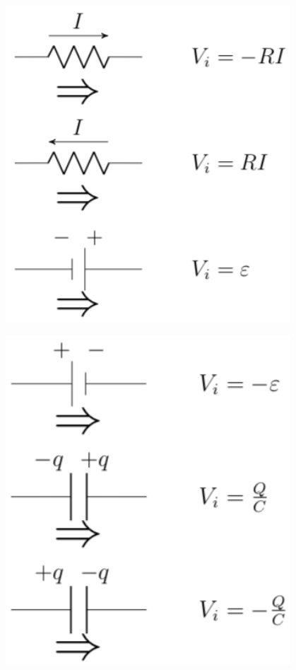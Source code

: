 \begin{minipage}{0.25\textwidth}
    \begin{center}
        \includegraphics[width=0.8\textwidth]{Figures/Vorzeichen1.png}
    \end{center}
\end{minipage}
\begin{minipage}{0.25\textwidth}
    \begin{center}    
        \includegraphics[width=0.8\textwidth]{Figures/Vorzeichen2.png}
    \end{center}
\end{minipage}
